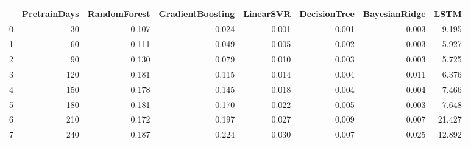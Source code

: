 \begin{tabular}{lrrrrrrr}
\toprule
{} &  PretrainDays &  RandomForest &  GradientBoosting &  LinearSVR &  DecisionTree &  BayesianRidge &   LSTM \\
\midrule
0 &            30 &         0.107 &             0.024 &      0.001 &         0.001 &          0.003 &  9.195 \\
1 &            60 &         0.111 &             0.049 &      0.005 &         0.002 &          0.003 &  5.927 \\
2 &            90 &         0.130 &             0.079 &      0.010 &         0.003 &          0.003 &  5.725 \\
3 &           120 &         0.181 &             0.115 &      0.014 &         0.004 &          0.011 &  6.376 \\
4 &           150 &         0.178 &             0.145 &      0.018 &         0.004 &          0.004 &  7.466 \\
5 &           180 &         0.181 &             0.170 &      0.022 &         0.005 &          0.003 &  7.648 \\
6 &           210 &         0.172 &             0.197 &      0.027 &         0.009 &          0.007 & 21.427 \\
7 &           240 &         0.187 &             0.224 &      0.030 &         0.007 &          0.025 & 12.892 \\
\bottomrule
\end{tabular}
